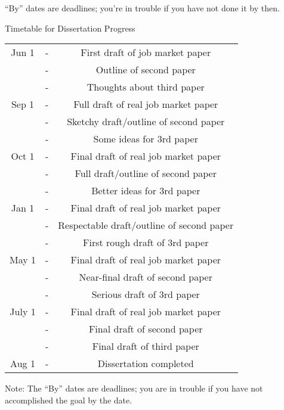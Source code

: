 \documentclass{\classes/econtex}
\begin{document}
``By'' dates are deadlines; you're in trouble if you have not done it by then.


\vfill\eject\pagebreak
\centerline{\LARGE Timetable for Dissertation Progress}

\begin{center}
\begin{tabular}{|ccc|}\hline
     Jun 1 & - & First draft of job market paper
\\       & - & Outline of second paper
\\       & - & Thoughts about third paper
\\   Sep 1 & - & Full draft of real job market paper
\\     & - & Sketchy draft/outline of second paper
\\     & - & Some ideas for 3rd paper
\\ Oct 1 & - & Final draft of real job market paper
\\     & - & Full draft/outline of second paper
\\     & - & Better ideas for 3rd paper
\\ Jan 1 & - & Final draft of real job market paper
\\     & - & Respectable draft/outline of second paper
\\     & - & First rough draft of 3rd paper
\\ May 1 & - & Final draft of real job market paper
\\     & - & Near-final draft of second paper
\\     & - & Serious draft of 3rd paper
\\ July 1 & - & Final draft of real job market paper
\\     & - & Final draft of second paper
\\     & - & Final draft of third paper
\\ Aug 1 & - & Dissertation completed
\\ \hline 
\end{tabular}
\end{center}



Note: The ``By'' dates are deadlines; you are in trouble if you have not
accomplished the goal by the date.
\end{document}
